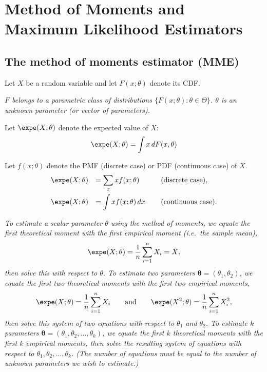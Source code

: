 \chapter{Method of Moments and Maximum Likelihood Estimators}\label{chap:mom-mle}
\setcounter{page}{1}
\startcontents[chapters]
\chapcontents

\section{The method of moments estimator (MME)}
Let $X$ be a random variable and let $F(x;\theta)$ denote its CDF.

\bit
\it $F$ belongs to a parametric class of distributions $\{F(x;\theta): \theta\in\Theta\}$.
\it $\theta$ is an unknown parameter (or vector of parameters).
\eit

\vspace{2ex}
Let $\expe(X;\theta)$ denote the expected value of $X$:
\[
\expe(X;\theta) = \int x\,dF(x,\theta)
\]

\vspace{2ex}
Let $f(x;\theta)$ denote the PMF (discrete case) or PDF (continuous case) of $X$.
\[\begin{array}{lll}
\expe(X;\theta) & = \displaystyle\sum_x x f(x;\theta) \qquad	& \text{(discrete case),} \\[3ex]
\expe(X;\theta) & = \displaystyle\int x f(x;\theta)\,dx 				& \text{(continuous case)}.
\end{array}\]



\ben
\it %
To estimate a scalar parameter $\theta$ using the \emph{method of moments}, we equate the first theoretical moment with the first empirical moment (i.e.\ the sample mean),
\[
\expe(X;\theta) = \frac{1}{n}\sum_{i=1}^n X_i = \bar{X},
\]
then solve this with respect to $\theta$.
\it %
To estimate two parameters $\mathbf{\theta} = (\theta_1,\theta_2)$, we equate the first two theoretical moments with the first two empirical moments,
\[
\expe(X;\mathbf{\theta}) = \frac{1}{n}\sum_{i=1}^n X_i
\qquad\text{and}\qquad
\expe(X^2;\mathbf{\theta}) = \frac{1}{n}\sum_{i=1}^n X_i^2,
\]
then solve this system of two equations with respect to $\theta_1$ and $\theta_2$.
\it %
To estimate $k$ parameters $\mathbf{\theta} = (\theta_1,\theta_2,\ldots,\theta_k)$, we equate the first $k$ theoretical moments with the first $k$ empirical moments, then solve the resulting system of equations with respect to $\theta_1,\theta_2,\ldots,\theta_k$. (The number of equations must be equal to the number of unknown parameters we wish to estimate.)
\een

